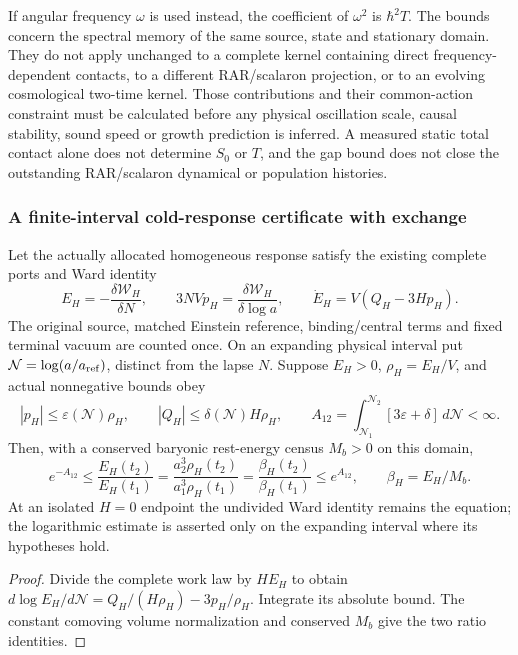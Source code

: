 \documentclass[12pt,a4paper]{article}
\begin{document}
If angular frequency $\omega$ is used instead, the coefficient of $\omega^2$
is $\hbar^2T$. The bounds concern the spectral memory of the same source,
state and stationary domain. They do not apply unchanged to a complete
kernel containing direct frequency-dependent contacts, to a different
RAR/scalaron projection, or to an evolving cosmological two-time kernel.
Those contributions and their common-action constraint must be calculated
before any physical oscillation scale, causal stability, sound speed or
growth prediction is inferred. A measured static total contact alone does
not determine $S_0$ or $T$, and the gap bound does not close the outstanding
RAR/scalaron dynamical or population histories.

\subsubsection{A finite-interval cold-response certificate with exchange}
\begin{corollary}
\label{p8:cor:v2210-lit-cold-work-certificate}
Let the actually allocated homogeneous response satisfy the existing
complete ports and Ward identity
\[
 E_H=-\frac{\delta\mathcal W_H}{\delta N},\qquad
 3NVp_H=\frac{\delta\mathcal W_H}{\delta\log a},\qquad
 \dot E_H=V(Q_H-3Hp_H).
\]
The original source, matched Einstein reference, binding/central terms and
fixed terminal vacuum are counted once. On an expanding physical interval
put $\mathcal N=\log(a/a_{\rm ref})$, distinct from the lapse $N$.
Suppose $E_H>0$, $\rho_H=E_H/V$, and actual nonnegative bounds obey
\[
 |p_H|\le\varepsilon(\mathcal N)\rho_H,
 \qquad |Q_H|\le\delta(\mathcal N)H\rho_H,
 \qquad A_{12}=\int_{\mathcal N_1}^{\mathcal N_2}
                           [3\varepsilon+\delta]\,d\mathcal N<\infty.
\]
Then, with a conserved baryonic rest-energy census $M_b>0$ on this domain,
\begin{equation}
\label{p8:eq:v2210-lit-cold-ratio-bound}
 \boxed{e^{-A_{12}}\le
    \frac{E_H(t_2)}{E_H(t_1)}
    =\frac{a_2^3\rho_H(t_2)}{a_1^3\rho_H(t_1)}
    =\frac{\beta_H(t_2)}{\beta_H(t_1)}
           \le e^{A_{12}},\qquad\beta_H=E_H/M_b.}
\end{equation}
At an isolated $H=0$ endpoint the undivided Ward identity remains the
equation; the logarithmic estimate is asserted only on the expanding
interval where its hypotheses hold.
\end{corollary}
\begin{proof}
Divide the complete work law by $HE_H$ to obtain
$d\log E_H/d\mathcal N=Q_H/(H\rho_H)-3p_H/\rho_H$.
Integrate its absolute bound. The constant comoving volume normalization
and conserved $M_b$ give the two ratio identities.
\end{proof}
\end{document}
